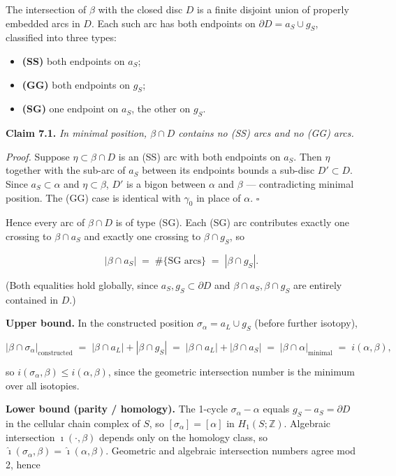 \documentclass[
]{article}
\providecommand{\tightlist}{%
  \setlength{\itemsep}{0pt}\setlength{\parskip}{0pt}}
\begin{document}
The intersection of \(\beta\) with the closed disc \(D\) is a finite
disjoint union of properly embedded arcs in \(D\). Each such arc has
both endpoints on \(\partial D = a_S \cup g_S\), classified into three
types:

\begin{itemize}
\tightlist
\item
  \textbf{(SS)} both endpoints on \(a_S\);
\item
  \textbf{(GG)} both endpoints on \(g_S\);
\item
  \textbf{(SG)} one endpoint on \(a_S\), the other on \(g_S\).
\end{itemize}

\textbf{Claim 7.1.} \emph{In minimal position, \(\beta \cap D\) contains
no (SS) arcs and no (GG) arcs.}

\emph{Proof.} Suppose \(\eta \subset \beta \cap D\) is an (SS) arc with
both endpoints on \(a_S\). Then \(\eta\) together with the sub-arc of
\(a_S\) between its endpoints bounds a sub-disc \(D' \subset D\). Since
\(a_S \subset \alpha\) and \(\eta \subset \beta\), \(D'\) is a bigon
between \(\alpha\) and \(\beta\) --- contradicting minimal position. The
(GG) case is identical with \(\gamma_0\) in place of \(\alpha\).
\(\square\)

Hence every arc of \(\beta \cap D\) is of type (SG). Each (SG) arc
contributes exactly one crossing to \(\beta \cap a_S\) and exactly one
crossing to \(\beta \cap g_S\), so

\[
|\beta \cap a_S| \;=\; \#\{\text{SG arcs}\} \;=\; |\beta \cap g_S|.
\]

(Both equalities hold globally, since \(a_S, g_S \subset \partial D\)
and \(\beta \cap a_S, \beta \cap g_S\) are entirely contained in \(D\).)

\textbf{Upper bound.} In the constructed position
\(\sigma_\alpha = a_L \cup g_S\) (before further isotopy),

\[
|\beta \cap \sigma_\alpha|_{\text{constructed}}
\;=\; |\beta \cap a_L| + |\beta \cap g_S|
\;=\; |\beta \cap a_L| + |\beta \cap a_S|
\;=\; |\beta \cap \alpha|_{\text{minimal}}
\;=\; i(\alpha, \beta),
\]

so \(i(\sigma_\alpha, \beta) \le i(\alpha, \beta)\), since the geometric
intersection number is the minimum over all isotopies.

\textbf{Lower bound (parity / homology).} The 1-cycle
\(\sigma_\alpha - \alpha\) equals \(g_S - a_S = \partial D\) in the
cellular chain complex of \(S\), so \([\sigma_\alpha] = [\alpha]\) in
\(H_1(S; \mathbb Z)\). Algebraic intersection
\(\hat\imath(\cdot, \beta)\) depends only on the homology class, so
\(\hat\imath(\sigma_\alpha, \beta) = \hat\imath(\alpha, \beta)\).
Geometric and algebraic intersection numbers agree mod 2, hence
\end{document}
